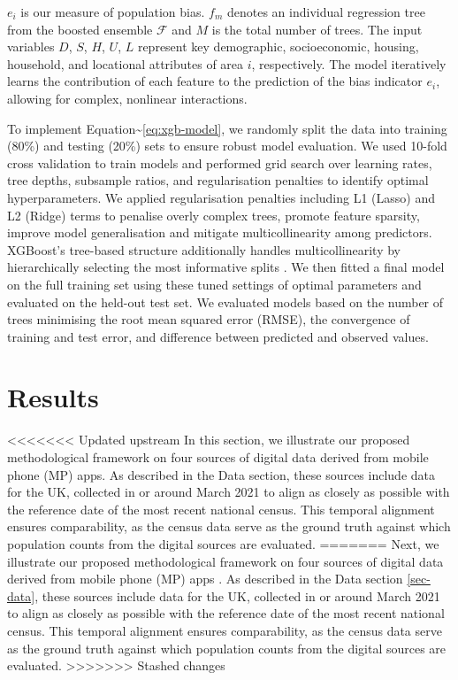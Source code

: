 \documentclass[]{rsos}%
\begin{document}
\(e_i\) is our measure of population bias. \(f_m\) denotes an individual
regression tree from the boosted ensemble \(\mathcal{F}\) and \(M\) is the
total number of trees. The input variables \(D\), \(S\), \(H\), \(U\), \(L\)
represent key demographic, socioeconomic, housing, household, and
locational attributes of area \(i\), respectively. The model iteratively
learns the contribution of each feature to the prediction of the bias
indicator \(e_i\), allowing for complex, nonlinear interactions.

To implement Equation\textasciitilde{}\ref{eq:xgb-model}, we randomly split the data
into training (80\%) and testing (20\%) sets to ensure robust model
evaluation. We used 10-fold cross validation to train models and
performed grid search over learning rates, tree depths, subsample
ratios, and regularisation penalties to identify optimal
hyperparameters. We applied regularisation penalties including L1
(Lasso) and L2 (Ridge) terms to penalise overly complex trees, promote
feature sparsity, improve model generalisation and mitigate
multicollinearity among predictors. XGBoost's tree-based structure
additionally handles multicollinearity by hierarchically selecting the
most informative splits \citep{chen2016}. We then fitted a final model on the
full training set using these tuned settings of optimal parameters and
evaluated on the held-out test set. We evaluated models based on the
number of trees minimising the root mean squared error (RMSE), the
convergence of training and test error, and difference between predicted
and observed values.

\section{Results}\label{results}

<<<<<<< Updated upstream
In this section, we illustrate our proposed methodological framework on
four sources of digital data derived from mobile phone (MP) apps. As
described in the Data section, these sources include data for the UK,
collected in or around March 2021 to align as closely as possible with
the reference date of the most recent national census. This temporal
alignment ensures comparability, as the census data serve as the ground
truth against which population counts from the digital sources are
evaluated.
=======
Next, we illustrate our proposed methodological framework on four
sources of digital data derived from mobile phone (MP) apps
. As
described in the Data section \ref{sec-data}, these
sources include data for the UK, collected in or around March 2021 to
align as closely as possible with the reference date of the most recent
national census. This temporal alignment ensures comparability, as the
census data serve as the ground truth against which population counts
from the digital sources are evaluated.
>>>>>>> Stashed changes
\end{document}
